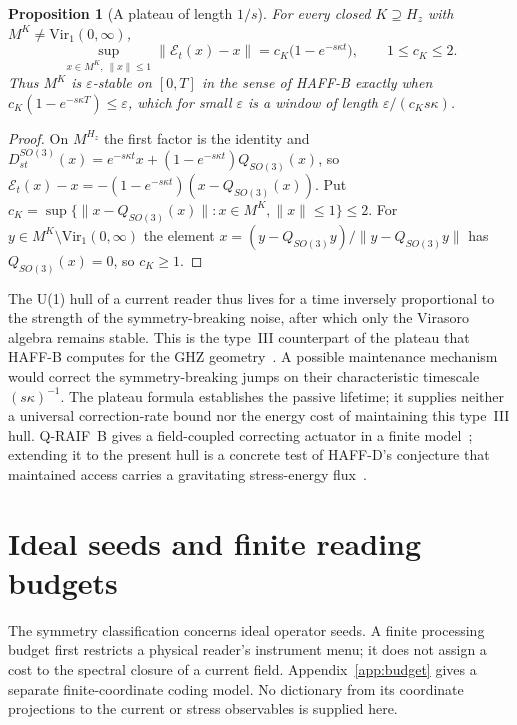 \documentclass[12pt]{article}
\newtheorem{proposition}[theorem]{Proposition}
\theoremstyle{definition}
\theoremstyle{remark}
\newcommand{\Vir}{\mathrm{Vir}}
\begin{document}
\begin{proposition}[A plateau of length \(1/s\)]\label{prop:plateau}
For every closed \(K\supseteq H_z\) with \(M^K\neq\Vir_1(0,\infty)\),
\[
\sup_{x\in M^K,\ \|x\|\le1}\|\mathcal E_t(x)-x\|=c_K\bigl(1-e^{-s\kappa t}\bigr),
\qquad 1\le c_K\le2 .
\]
Thus \(M^K\) is \(\varepsilon\)-stable on \([0,T]\) in the sense of HAFF-B exactly when
\(c_K(1-e^{-s\kappa T})\le\varepsilon\), which for small \(\varepsilon\) is a window of
length \(\varepsilon/(c_Ks\kappa)\).
\end{proposition}

\begin{proof}
On \(M^{H_z}\) the first factor is the identity and
\(D^{SO(3)}_{st}(x)=e^{-s\kappa t}x+(1-e^{-s\kappa t})Q_{SO(3)}(x)\), so
\(\mathcal E_t(x)-x=-(1-e^{-s\kappa t})(x-Q_{SO(3)}(x))\). Put
\(c_K=\sup\{\|x-Q_{SO(3)}(x)\|:x\in M^K,\|x\|\le1\}\le2\). For \(y\in M^K\setminus\Vir_1(0,\infty)\)
the element \(x=(y-Q_{SO(3)}y)/\|y-Q_{SO(3)}y\|\) has \(Q_{SO(3)}(x)=0\), so
\(c_K\ge1\).
\end{proof}

The U(1) hull of a current reader thus lives for a time inversely proportional to the
strength of the symmetry-breaking noise, after which only the Virasoro algebra remains
stable. This is the type~III counterpart of the plateau that HAFF-B computes for the
GHZ geometry~\cite{HAFFB}. A possible maintenance mechanism would correct the symmetry-breaking jumps on their
characteristic timescale \((s\kappa)^{-1}\). The plateau formula establishes the passive
lifetime; it supplies neither a universal correction-rate bound nor the energy cost of
maintaining this type~III hull. Q-RAIF~B gives a field-coupled correcting actuator in a
finite model~\cite{QRAIFB}; extending it to the present hull is a concrete test of HAFF-D's
conjecture that maintained access carries a gravitating stress-energy flux~\cite{HAFFD}.

\section{Ideal seeds and finite reading budgets}\label{sec:foreground}

The symmetry classification concerns ideal operator seeds. A finite
processing budget first restricts a physical reader's instrument menu;
it does not assign a cost to the spectral closure of a current field.
Appendix~\ref{app:budget} gives a separate finite-coordinate coding model.
No dictionary from its coordinate projections to the current or stress
observables is supplied here.
\end{document}
